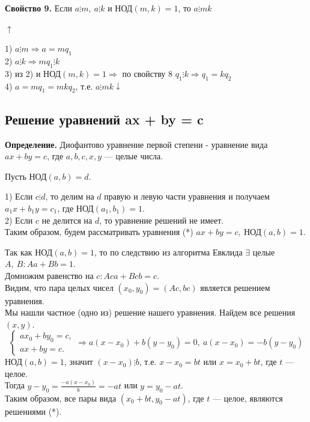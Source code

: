 \documentclass{article}
\begin{document}
    \textbf{Свойство 9.} Если \( a \vdots m,\ a \vdots k \) и \( \textrm{НОД}(m,k) = 1 \), то \(a \vdots mk \)

    \( \uparrow \)

    1) \( a \vdots m \Rightarrow a = mq_1 \)\\
    2) \( a \vdots k \Rightarrow mq_1 \vdots k \)\\
    3) из 2) и \( \textrm{НОД}(m,k) = 1 \Rightarrow \) по свойству 8 \( q_1 \vdots k \Rightarrow q_1 = kq_2 \)\\
    4) \( a = mq_1 = mkq_2 \), т.е. \( a \vdots mk \downarrow \)

    \subsection{Решение уравнений ax + by = c}
    \textbf{Определение.} Диофантово уравнение первой степени - уравнение вида \( ax + by = c \), где \( a,b,c,x,y \) --- целые числа.

    Пусть \( \textrm{НОД}(a,b) = d \).

    1) Если \( c \vdots d \), то делим на \( d \) правую и левую части уравнения и получаем \( a_1x + b_1y = c_1 \), где \( \textrm{НОД}(a_1, b_1) = 1 \).\\
    2) Если \( c \) не делится на \( d \), то уравнение решений не имеет.\\

    Таким образом, будем рассматривать уравнения (*) \( ax + by = c,\ \textrm{НОД}(a,b) = 1 \).
    
    Так как \( \textrm{НОД}(a, b) = 1 \), то по следствию из алгоритма Евклида \( \exists \) целые \( A,\ B: Aa + Bb = 1 \).\\
    Домножим равенство на \( c: Aca + Bcb = c \).\\
    Видим, что пара целых чисел \( (x_0,y_0) = (Ac, bc) \) является решением уравнения.\\
    Мы нашли частное (одно из) решение нашего уравнения. Найдем все решения \( (x,y) \).\\

    \[ \begin{cases}
        ax_0 + by_0 = c,\\
        ax + by = c.
    \end{cases} \Rightarrow a(x - x_0) + b(y - y_0) = 0,\ a(x - x_0) = -b(y - y_0) \]
    \( \textrm{НОД}(a,b) = 1 \), значит \( (x - x_0) \vdots b \), т.е. \( x - x_0 = bt \) или \( x = x_0 + bt \), где \( t \) --- целое.\\
    Тогда \( y - y_0 = \frac{-a(x - x_0)}{b} = -at \) или \( y = y_0 - at \).\\
    Таким образом, все пары вида \( (x_0 + bt, y_0 - at) \), где \( t \) --- целое, являются решениями (*).
\end{document}
